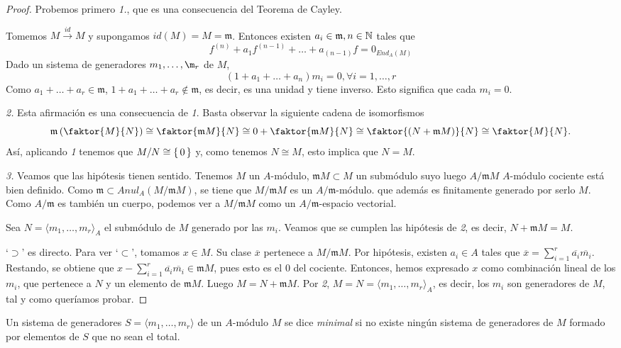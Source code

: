 \documentclass[../main.tex]{subfiles}
\begin{document}
\begin{proof}
Probemos primero \textit{1.}, que es una consecuencia del Teorema de Cayley.

Tomemos $M\overset{id}{\longrightarrow}M$ y supongamos $id(M)=M=\mathfrak{m}$. Entonces existen $a_i\in\mathfrak{m},n\in\mathbb{N}$ tales que $$f^{(n)}+a_1f^{(n-1)}+\dots+a_{(n-1)}f=0_{End_A(M)}$$ Dado un sistema de generadores $m_1,\dots,\m_r$ de $M$, $$(1+a_1+\dots+a_n)m_i=0, \forall i=1,\dots,r$$ Como $a_1+\dots+a_r\in\mathfrak{m}$, $1+a_1+\dots+a_r\notin\mathfrak{m}$, es decir, es una unidad y tiene inverso. Esto significa que cada $m_i=0$.

\textit{2.} Esta afirmación es una consecuencia de \textit{1}. Basta observar la siguiente cadena de isomorfismos
$$\mathfrak m\left(\faktor{M}{N}\right)\cong\faktor{\mathfrak m M}{N}\cong 0+\faktor{\mathfrak m M}{N}\cong \faktor{(N+\mathfrak m M)}{N}\cong \faktor{M}{N}.$$
Así, aplicando \textit{1} tenemos que $M/N\cong \set{0}$ y, como tenemos $N\cong M$, esto implica que $N=M.$

\textit{3.} Veamos que las hipótesis tienen sentido. Tenemos $M$ un $A$-módulo, $\mathfrak{m}M\subset M$ un submódulo suyo luego $A/\mathfrak{m}M$ $A$-módulo cociente está bien definido. Como $\mathfrak{m}\subset Anul_A(M/\mathfrak{m}M)$, se tiene que $M/\mathfrak{m}M$ es un $A/\mathfrak{m}$-módulo. que además es finitamente generado por serlo $M$. Como $A/\mathfrak{m}$ es también un cuerpo, podemos ver a $M/\mathfrak{m}M$ como un $A/\mathfrak{m}$-espacio vectorial.

Sea $N=\langle m_1,\dots,m_r\rangle_A$ el submódulo de $M$ generado por las $m_i$. Veamos que se cumplen las hipótesis de \textit{2}, es decir, $N+\mathfrak{m}M=M$.

`$\supset$' es directo. Para ver `$\subset$', tomamos $x\in M$. Su clase $\overline{x}$ pertenece a $M/\mathfrak{m}M$. Por hipótesis, existen $a_i\in A$ tales que $\overline{x}=\sum_{i=1}^{r}\overline{a_i}\overline{m_i}$. Restando, se obtiene que $x-\sum_{i=1}^{r}\overline{a_i}\overline{m_i}\in\mathfrak{m}M$, pues esto es el $0$ del cociente. Entonces, hemos expresado $x$ como combinación lineal de los $m_i$, que pertenece a $N$ y un elemento de $\mathfrak{m}M$. Luego $M=N+\mathfrak{m}M$. Por \textit{2}, $M=N=\langle m_1,\dots,m_r\rangle_A$, es decir, los $m_i$ son generadores de $M$, tal y como queríamos probar.
\end{proof}
\begin{definition}
Un sistema de generadores $S=\langle m_1,\dots,m_r\rangle$ de un $A$-módulo $M$ se dice \textit{minimal} si no existe ningún sistema de generadores de $M$ formado por elementos de $S$ que no sean el total.
\end{definition}
\end{document}
